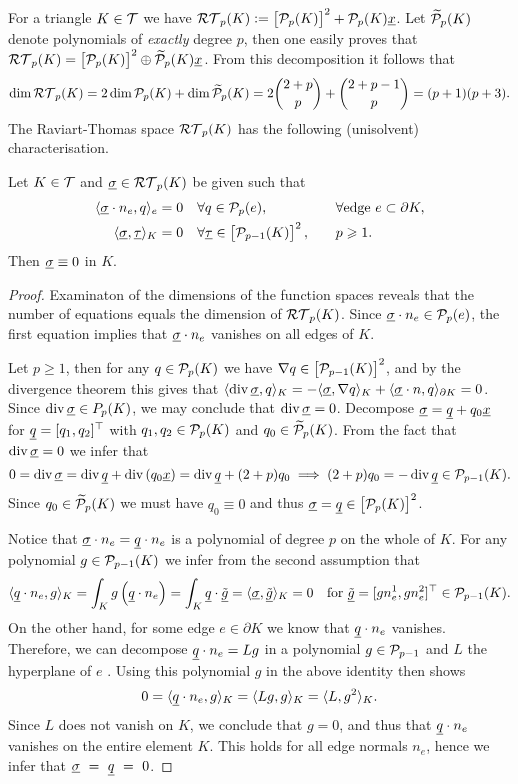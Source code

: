 \documentclass[thesis.tex]{subfiles}
\begin{document}
For a triangle $K \in  \T$ we have $\RT_p(K) := \left[ \P_p(K)\right]^2 + \P_p(K)\v{x}$.
Let $\wt \P_p(K)$ denote polynomials of \emph{exactly} degree $p$, then one easily proves that
${\RT_p(K) = \left [\P_p(K)\right]^2 \oplus \wt \P_p(K) \v{x}}$.
From this decomposition it follows that
\[
  \dim{\RT_p(K)} = 2 \dim{\P_p(K)}+ \dim{\wt \P_p(K)} = 2 {2 + p \choose p} + {2 + p - 1 \choose p} = (p+1)(p+3).
\]
The Raviart-Thomas space $\RT_p(K)$ has  the following (unisolvent) characterisation.
\begin{thm}
  \label{thm:rtunisol}
  Let $K \in  \T$ and $\vsig \in \RT_p(K)$ be given such that
  \begin{alignat*}{2}
    \ip{\vsig \cdot n_e, q}_e &= 0 \quad \forall q \in \P_p(e), &&\quad \forall \text{edge } e \subset \partial K,\\
    \ip{\vsig, \vtau}_K &= 0 \quad \forall \vtau \in \left[\P_{p-1}(K)\right]^2, &&\quad p \geq 1.
  \end{alignat*}
  Then $\vsig \equiv 0$ in $K$.
\end{thm}
\begin{proof}
  Examinaton of the dimensions of the function spaces reveals that the number of equations equals the dimension of $\RT_p(K)$.
  Since $\vsig \cdot n_e \in \P_p(e)$, the first equation implies that $\vsig \cdot n_e$ vanishes on all edges of $K$.

  Let $p \geq 1$, then for any $q \in \P_p(K)$ we have $\nabla q \in \left[\P_{p-1}(K)\right]^2$, and by the divergence theorem this gives that
  $\ip{\div \vsig, q}_K = - \ip{\vsig, \nabla q}_K + \ip{\vsig \cdot n, q}_{\partial K} = 0$. Since $\div \vsig \in P_p(K)$, we
  may conclude that $\div \vsig = 0$.  Decompose $\vsig = \v{q} + q_0\v{x}$ for $\v{q} = [q_1, q_2]^\top$ with $q_1, q_2  \in\P_p(K)$ and $q_0 \in  \wt \P_p(K)$. From the fact that $\div \vsig =0$ we infer that
  \[
    0 = \div \vsig = \div \v{q} + \div \left(q_0 \v{x}\right) = \div \v{q} + (2 + p) q_0 \implies (2 + p) q_0 = - \div \v{q} \in \P_{p-1}(K).
  \]
  Since $q_0 \in \wt \P_p(K)$ we must have $q_0 \equiv 0$ and thus $\vsig = \v{q} \in \left[\P_{p}(K)\right]^2$.

  Notice that $\vsig \cdot n_e = \v{q} \cdot n_e$ is a polynomial of degree $p$  on the whole of $K$.
  For any polynomial $g \in \P_{p-1}(K)$ we infer from the second assumption that
  \[
    \ip{\v{q} \cdot n_e, g}_K = \int_K g \left(\v{q} \cdot n_e\right) = \int_K \v{q} \cdot \v{\tilde g} = \ip{\vsig, \v{\tilde g}}_K = 0 \quad \text{for } \v{\tilde g} = [g n_e^1, gn_e^2]^\top \in \P_{p-1}(K).
  \]
  On the other hand, for some edge $e \in \partial K$ we know that  $\v{q} \cdot n_e$ vanishes.
  Therefore, we can decompose $\v{q}\cdot n_e = Lg$ in a polynomial $g \in \P_{p-1}$ and $L$ the hyperplane of $e$ \cite[Lem~3.1.10]{brenner}. Using this polynomial $g$ in the above identity then shows
  \[
    0 = \ip{\v{q}\cdot n_e, g}_K = \ip{Lg, g}_K = \ip{L,g^2}_K.
  \]
  Since $L$ does not vanish on $K$, we conclude that $g = 0$, and thus that $\v{q}\cdot n_e$ vanishes
  on the entire element $K$. This holds for all edge  normals $n_e$,  hence we infer that $\vsig~=~\v{q}~=~0$.
\end{proof}
\end{document}
